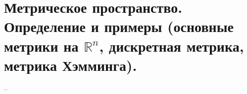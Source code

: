 \section{Метрическое пространство. Определение и примеры (основные метрики на $\mathbb{R}^n$, дискретная метрика, метрика Хэмминга).}
--
\newline